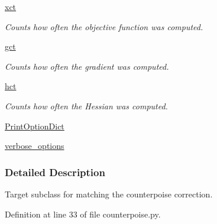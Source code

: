 \begin{DoxyCompactItemize}
\hyperlink{classforcebalance_1_1target_1_1Target_ad4cd0ab38d8fc97d3e7a6e22ce130a16}{xct}
\begin{DoxyCompactList}\small\item\em \-Counts how often the objective function was computed. \end{DoxyCompactList}\item 
\hyperlink{classforcebalance_1_1target_1_1Target_aff6e42b84dd8eb5a4dc3b47aa58bc64c}{gct}
\begin{DoxyCompactList}\small\item\em \-Counts how often the gradient was computed. \end{DoxyCompactList}\item 
\hyperlink{classforcebalance_1_1target_1_1Target_ae929918b7e695a99d7ec946d06d793e1}{hct}
\begin{DoxyCompactList}\small\item\em \-Counts how often the \-Hessian was computed. \end{DoxyCompactList}\item 
\hyperlink{classforcebalance_1_1BaseClass_afc6659278497d7245bc492ecf405ccae}{\-Print\-Option\-Dict}
\item 
\hyperlink{classforcebalance_1_1BaseClass_afd68efa29ccd2f320f4cf82198214aac}{verbose\-\_\-options}
\end{DoxyCompactItemize}


\subsubsection{\-Detailed \-Description}
\-Target subclass for matching the counterpoise correction. 



\-Definition at line 33 of file counterpoise.\-py.



